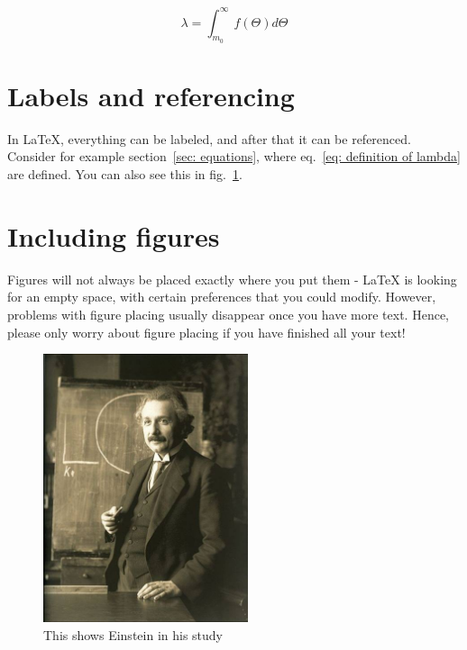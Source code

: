 \documentclass{article}
\begin{document}
\begin{equation}\label{eq: definition of lambda}
\lambda = \int_{m_0}^\infty f(\Theta) d \Theta
\end{equation}


\section{Labels and referencing}

In LaTeX, everything can be labeled, and after that it can be referenced. Consider for example section~\ref{sec: equations}, where eq.~\ref{eq: definition of lambda} are defined. You can also see this in fig.~\ref{fig: einstein}.

\section{Including figures}

Figures will not always be placed exactly where you put them - LaTeX is looking for an empty space, with certain preferences that you could modify. However, problems with figure placing usually disappear once you have more text. Hence, please only worry about figure placing if you have finished all your text!


\begin{figure}
\centering
\includegraphics[width=6cm]{einstein} %
\caption{This shows Einstein in his study}\label{fig: einstein}
\end{figure}  
\end{document}
